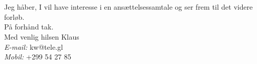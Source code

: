 \documentclass[11pt,a4paper,twoside]{article}
\begin{document}
\section*{}
Jeg håber, I vil have interesse i en ansættelsessamtale og ser frem til det videre forløb.
\\[2cm]
På forhånd tak.
\\[.5cm]
Med venlig hilsen Klaus\\[.5cm]
\textit{E-mail:} kw@tele.gl\\
\textit{Mobil:} +299 54 27 85\\


\printbibliography[title=Referencer]
\end{document}
